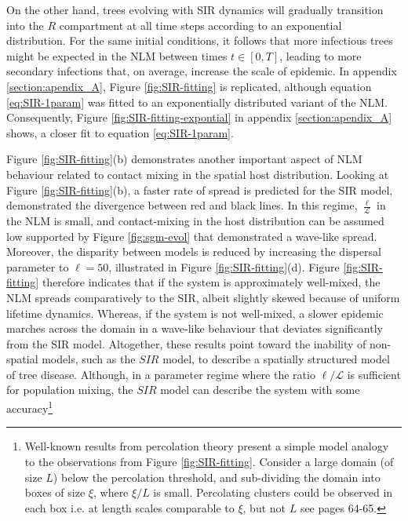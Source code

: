 On the other hand, trees evolving with SIR dynamics will gradually transition into the $R$ compartment at all time steps according to an exponential distribution. 
For the same initial conditions, it follows that more infectious trees might be expected in the NLM between times $t\in [0, T]$, leading to more secondary infections that, on average, increase the scale of epidemic.
In appendix \ref{section:apendix_A}, Figure \ref{fig:SIR-fitting} is replicated, although equation \ref{eq:SIR-1param} was fitted to an exponentially distributed variant of the NLM.
Consequently, Figure \ref{fig:SIR-fitting-expontial} in appendix \ref{section:apendix_A} shows, a closer fit to equation \ref{eq:SIR-1param}.
 
Figure \ref{fig:SIR-fitting}(b) demonstrates another important aspect of NLM behaviour related to contact mixing in the spatial host distribution.
Looking at Figure \ref{fig:SIR-fitting}(b), a faster rate of spread is predicted for the SIR model,
demonstrated the divergence between red and black lines.
In this regime, $\frac{\ell}{\mathcal{L}}$ in the NLM is small, and contact-mixing in the host distribution can be assumed low \textemdash supported by Figure \ref{fig:sgm-evol} that demonstrated a wave-like spread. 
Moreover, the disparity between models is reduced by increasing the dispersal parameter to $\ell=50$, illustrated in Figure \ref{fig:SIR-fitting}(d).
Figure \ref{fig:SIR-fitting} therefore indicates that if the system is approximately well-mixed, the NLM spreads comparatively to the SIR, albeit slightly skewed because of uniform lifetime dynamics.
Whereas, if the system is not well-mixed, a slower epidemic marches across the domain in a wave-like behaviour that deviates significantly from the SIR model.
Altogether, these results point toward the inability of non-spatial models, such as the $SIR$ model, to describe a spatially structured model of tree disease. Although, in a parameter regime where the ratio $\ell / \mathcal{L}$ is sufficient for population mixing, the $SIR$ model can describe the system with some accuracy\footnote{
Well-known results from percolation theory present a simple model analogy to the observations from Figure \ref{fig:SIR-fitting}.
Consider a large domain (of size $L$) below the percolation threshold, and sub-dividing the domain into boxes of size $\xi$, where $\xi / L$ is small.
Percolating clusters could be observed in each box i.e. at length scales comparable to $\xi$, but not $L$ see \cite{stauffer2018introduction} pages 64-65.} 


